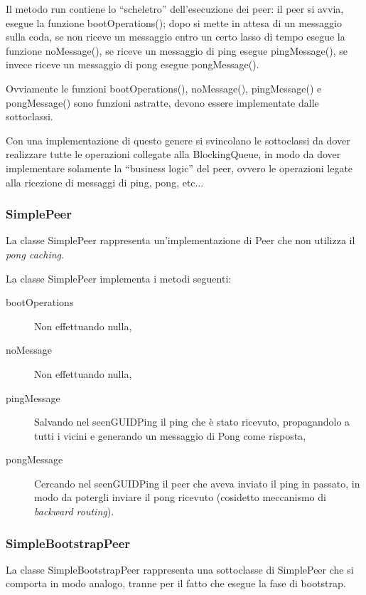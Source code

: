 \documentclass[a4paper,11pt]{article}
\begin{document}
Il metodo \textsf{run} contiene lo ``scheletro'' dell'esecuzione dei peer: il peer si avvia, esegue la funzione \textsf{bootOperations()}; dopo si mette in attesa di un messaggio sulla coda, se non riceve un messaggio entro un certo lasso di tempo esegue la funzione \textsf{noMessage()}, se riceve un messaggio di ping esegue \textsf{pingMessage()}, se invece riceve un messaggio di pong esegue \textsf{pongMessage()}.

Ovviamente le funzioni \textsf{bootOperations()}, \textsf{noMessage()}, \textsf{pingMessage()} e \textsf{pongMessage()} sono funzioni astratte, devono essere implementate dalle sottoclassi.

Con una implementazione di questo genere si svincolano le sottoclassi da dover realizzare tutte le operazioni collegate alla \textsf{BlockingQueue}, in modo da dover implementare solamente la ``business logic'' del peer, ovvero le operazioni legate alla ricezione di messaggi di ping, pong, etc...

\subsubsection{\textsf{SimplePeer}}

La classe \textsf{SimplePeer} rappresenta un'implementazione di \textsf{Peer} che non utilizza il \emph{pong caching}.

La classe \textsf{SimplePeer} implementa i metodi seguenti:
\begin{description}
\item[\textsf{bootOperations}] Non effettuando nulla,
\item[\textsf{noMessage}] Non effettuando nulla,
\item[\textsf{pingMessage}] Salvando nel \textsf{seenGUIDPing} il ping che \`e stato ricevuto, propagandolo a tutti i vicini e generando un messaggio di Pong come risposta,
\item[\textsf{pongMessage}] Cercando nel \textsf{seenGUIDPing} il peer che aveva inviato il ping in passato, in modo da potergli inviare il pong ricevuto (cosidetto meccanismo di \emph{backward routing}).
\end{description}

\subsubsection{\textsf{SimpleBootstrapPeer}}

La classe \textsf{SimpleBootstrapPeer} rappresenta una sottoclasse di \textsf{SimplePeer} che si comporta in modo analogo, tranne per il fatto che esegue la fase di bootstrap.
\end{document}
